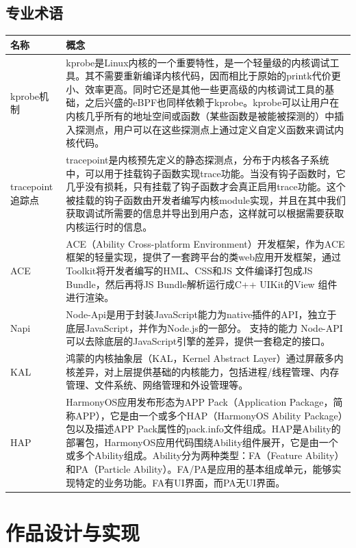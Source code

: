 \documentclass[12pt,a4paper]{ctexart}
\begin{document}
\subsection{专业术语}
\newpage
  \begin{longtable}{|l|p{10cm}|}
    \hline
    名称&概念\\
    \hline
    kprobe机制&kprobe是Linux内核的一个重要特性，是一个轻量级的内核调试工具。其不需要重新编译内核代码，因而相比于原始的printk代价更小、效率更高。同时它还是其他一些更高级的内核调试工具的基础，之后兴盛的eBPF也同样依赖于kprobe。kprobe可以让用户在内核几乎所有的地址空间或函数（某些函数是被能被探测的）中插入探测点，用户可以在这些探测点上通过定义自定义函数来调试内核代码。\\
    \hline
tracepoint追踪点 & tracepoint是内核预先定义的静态探测点，分布于内核各子系统中，可以用于挂载钩子函数实现trace功能。当没有钩子函数时，它几乎没有损耗，只有挂载了钩子函数才会真正启用trace功能。这个被挂载的钩子函数由开发者编写内核module实现，并且在其中我们获取调试所需要的信息并导出到用户态，这样就可以根据需要获取内核运行时的信息。 \\
\hline
ACE              & ACE（Ability Cross-platform Environment）开发框架，作为ACE框架的轻量实现，提供了一套跨平台的类web应用开发框架，通过Toolkit将开发者编写的HML、CSS和JS 文件编译打包成JS Bundle，然后再将JS Bundle解析运行成C++ UIKit的View 组件进行渲染。 \\
\hline
Napi             & Node-Api是用于封装JavaScript能力为native插件的API，独立于底层JavaScript，并作为Node.js的一部分。 支持的能力 Node-API可以去除底层的JavaScript引擎的差异，提供一套稳定的接口。 \\
\hline
KAL              & 鸿蒙的内核抽象层（KAL，Kernel Abstract Layer）通过屏蔽多内核差异，对上层提供基础的内核能力，包括进程/线程管理、内存管理、文件系统、网络管理和外设管理等。 \\
\hline
HAP              & HarmonyOS应用发布形态为APP Pack（Application Package，简称APP），它是由一个或多个HAP（HarmonyOS Ability Package）包以及描述APP Pack属性的pack.info文件组成。HAP是Ability的部署包，HarmonyOS应用代码围绕Ability组件展开，它是由一个或多个Ability组成。Ability分为两种类型：FA（Feature Ability）和PA（Particle Ability）。FA/PA是应用的基本组成单元，能够实现特定的业务功能。FA有UI界面，而PA无UI界面。 \\
\hline

  \end{longtable}


\section{作品设计与实现}
\end{document}
